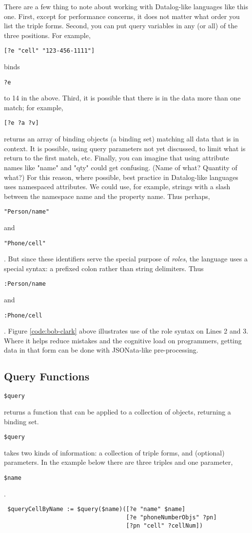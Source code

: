 \documentclass[9pt,letterpaper]{article}
\newcommand{\stt}[1]{\begin{footnotesize}\texttt{#1}\end{footnotesize}}
\begin{document}
There are a few thing to note about working with Datalog-like languages like this one.
First, except for performance concerns, it does not matter what order you list the triple forms.
Second, you can put query variables in any (or all) of the three positions.
For example, \stt{[?e "cell" "123-456-1111"]} binds \stt{?e} to 14 in the above.
Third, it is possible that there is in the data more than one match;
for example, \stt{[?e ?a ?v]} returns an array of binding objects (a binding set) matching all data that is in context.
It is possible, using query parameters not yet discussed, to limit what is return to the first match, etc.
Finally, you can imagine that using attribute names like "name" and "qty" could get confusing. (Name of what? Quantity of what?)
For this reason, where possible, best practice in Datalog-like languages uses namespaced attributes.
We could use, for example, strings with a slash between the namespace name and the property name.
Thus perhaps, \stt{"Person/name"} and \stt{"Phone/cell"}.
But since these identifiers serve the special purpose of \textit{roles}, the language uses a special syntax: a prefixed colon rather than string delimiters.
Thus \stt{:Person/name} and \stt{:Phone/cell}.
Figure \ref{code:bob-clark} above illustrates use of the role syntax on Lines 2 and 3.
Where it helps reduce mistakes and the cognitive load on programmers, getting data in that form can be done with JSONata-like pre-processing.

\subsection{Query Functions}

\stt{\$query} returns a function that can be applied to a collection of objects, returning a binding set. 
\stt{\$query} takes two kinds of information: a collection of triple forms, and (optional) parameters.
In the example below there are three triples and one parameter,  \stt{\$name}.

\begin{lstlisting}
 $queryCellByName := $query($name)([?e "name" $name]
                                   [?e "phoneNumberObjs" ?pn]
                                   [?pn "cell" ?cellNum])
\end{lstlisting}
\end{document}
